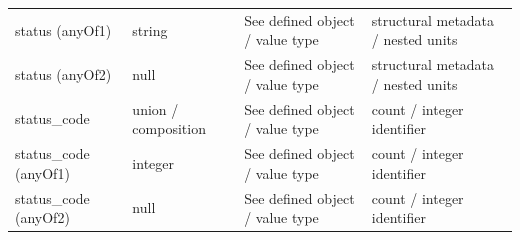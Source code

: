 \begin{longtable}{@{}>{\raggedright\arraybackslash}p{}>{\raggedright\arraybackslash}p{}>{\raggedright\arraybackslash}p{}>{\raggedright\arraybackslash}p{}@{}}
status (anyOf1) & string & See defined object /\allowbreak{} value type & structural metadata /\allowbreak{} nested units\\
status (anyOf2) & null & See defined object /\allowbreak{} value type & structural metadata /\allowbreak{} nested units\\
status\_\allowbreak{}code & union /\allowbreak{} composition & See defined object /\allowbreak{} value type & count /\allowbreak{} integer identifier\\
status\_\allowbreak{}code (anyOf1) & integer & See defined object /\allowbreak{} value type & count /\allowbreak{} integer identifier\\
status\_\allowbreak{}code (anyOf2) & null & See defined object /\allowbreak{} value type & count /\allowbreak{} integer identifier\\
\end{longtable}\endgroup
